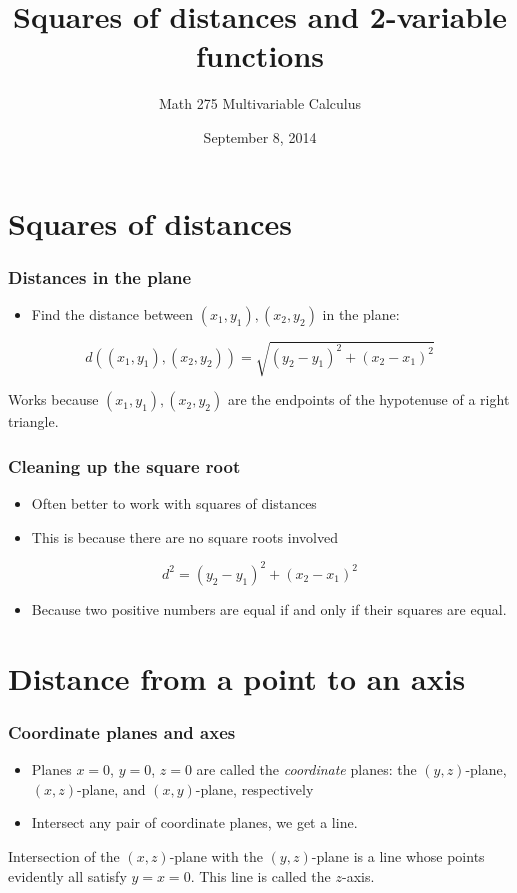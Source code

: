 \documentclass[11pt,ignorenonframetext,aspectratio=169]{beamer}
\title{Squares of distances and 2-variable functions}
\author{Math 275 Multivariable Calculus}
\date{September 8, 2014}
\begin{document}
\frame{\titlepage}

\section{Squares of distances}

\begin{frame}\frametitle{Distances in the plane}

\begin{itemize}[<+->]

\item
  Find the distance between $(x_1, y_1), (x_2, y_2)$ in the plane:
\end{itemize}

\[ d((x_1, y_1), (x_2, y_2)) = \sqrt{(y_2 - y_1)^2 + (x_2 - x_1)^2} \]

Works because $(x_1, y_1), (x_2, y_2)$ are the endpoints of the
hypotenuse of a right triangle.

\end{frame}

\begin{frame}\frametitle{Cleaning up the square root}

\begin{itemize}
\item
  Often better to work with squares of distances
\item
  This is because there are no square roots involved
\end{itemize}

\[ d^2 = (y_2 - y_1)^2 + (x_2 - x_1)^2 \]

\begin{itemize}

\item
  Because two positive numbers are equal if and only if their squares
  are equal.
\end{itemize}

\end{frame}

\section{Distance from a point to an axis}

\begin{frame}\frametitle{Coordinate planes and axes}

\begin{itemize}
\item
  Planes $x = 0$, $y = 0$, $z = 0$ are called the \emph{coordinate}
  planes: the $(y,z)$-plane, $(x,z)$-plane, and $(x,y)$-plane,
  respectively
\item
  Intersect any pair of coordinate planes, we get a line.
\end{itemize}

Intersection of the $(x,z)$-plane with the $(y,z)$-plane is a line whose
points evidently all satisfy $y = x = 0$. This line is called the
$z$-axis.

\end{frame}
\end{document}
